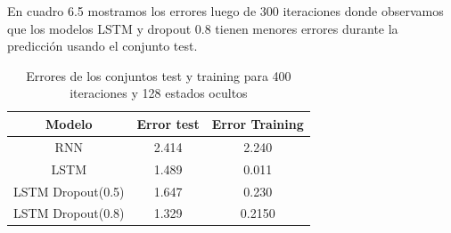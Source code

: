 En cuadro 6.5 mostramos los errores luego de 300 iteraciones donde observamos que los modelos LSTM y dropout 0.8 tienen menores errores durante la predicción usando el conjunto test.

\begin{table}[H]
	\centering
	\begin{tabular}{|c|c|c|}
		\hline
		\rowcolor{Gray}  Modelo & Error test& Error Training \\ \hline
		RNN &        2.414  &             2.240      \\ \hline
		LSTM &        1.489  &          0.011       \\ \hline
		LSTM Dropout(0.5) & 1.647         &     0.230          \\ \hline
		LSTM Dropout(0.8) &	1.329		&	0.2150	\\ \hline
	\end{tabular}
	
	\caption{Errores de los conjuntos test y training para 400 iteraciones y 128 estados ocultos}
\end{table}
\newpage
